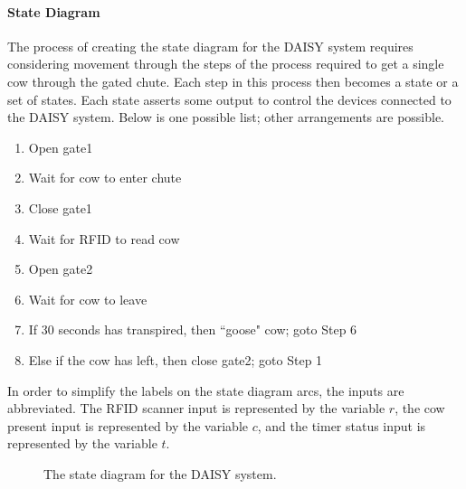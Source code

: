 \paragraph{State Diagram}
The process of creating the state diagram for the DAISY system 
requires considering movement through the steps of the process required
to get a single cow through the gated chute.  Each step in this 
process then becomes a state or a set of states.  Each state 
asserts some output to control the devices connected to 
the DAISY system.  Below is one possible list; other arrangements are possible.

\begin{enumerate}
\item Open gate1
\item Wait for cow to enter chute
\item Close gate1
\item Wait for RFID to read cow
\item Open gate2
\item Wait for cow to leave
\item If 30 seconds has transpired, then ``goose" cow; goto Step 6 
\item Else if the cow has left, then close gate2; goto Step 1
\end{enumerate}

In order to simplify the labels on the state diagram arcs, the inputs 
are abbreviated. The RFID scanner input is represented by the variable $r$,
the cow present input is represented by the variable $c$, and the timer 
status input is represented by the variable $t$.

\begin{figure}[ht]

\caption{The state diagram for the DAISY system.}
\label{fig:daisySD}

\end{figure}


